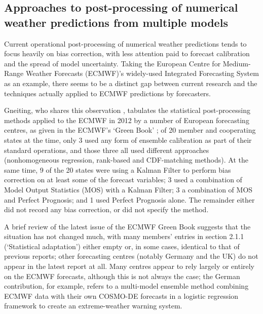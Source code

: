 \documentclass[10pt,fleqn]{article}
\begin{document}

\subsection*{Approaches to post-processing of numerical weather predictions from multiple models}
Current operational post-processing of numerical weather predictions tends to focus heavily on bias correction, with less attention paid to forecast calibration and the spread of model uncertainty. Taking the European Centre for Medium-Range Weather Forecasts (ECMWF)'s widely-used Integrated Forecasting System as an example, there seems to be a distinct gap between current research and the techniques actually applied to ECMWF predictions by forecasters.

Gneiting, who shares this observation \cite{Gneiting2014}, tabulates the statistical post-processing methods applied to the ECMWF in 2012 by a number of European forecasting centres, as given in the ECMWF's `Green Book' \cite{GreenBook2012}; of 20 member and cooperating states at the time, only 3 used any form of ensemble calibration as part of their standard operations, and those three all used different approaches (nonhomogeneous regression, rank-based and CDF-matching methods). At the same time, 9 of the 20 states were using a Kalman Filter to perform bias correction on at least some of the forecast variables; 3 used a combination of Model Output Statistics (MOS) with a Kalman Filter; 3 a combination of MOS and Perfect Prognosis; and 1 used Perfect Prognosis alone. The remainder either did not record any bias correction, or did not specify the method. 

A brief review of the latest issue of the ECMWF Green Book \cite{GreenBook2016} suggests that the situation has not changed much, with many members' entries in section 2.1.1 (`Statistical adaptation') either empty or, in some cases, identical to that of previous reports; other forecasting centres (notably Germany and the UK) do not appear in the latest report at all. Many centres appear to rely largely or entirely on the ECMWF forecasts, although this is not always the case; the German contribution, for example, refers to a multi-model ensemble method combining ECMWF data with their own COSMO-DE forecasts in a logistic regression framework to create an extreme-weather warning system.
\end{document}
